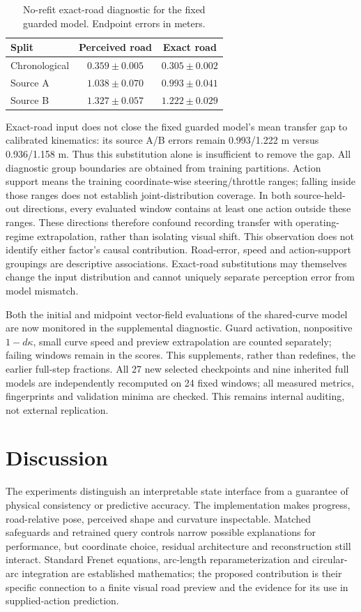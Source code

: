 \documentclass[preprint,12pt]{elsarticle}
\begin{document}
\begin{table}[htbp]
\centering\small
\caption{No-refit exact-road diagnostic for the fixed guarded model. Endpoint errors in meters.}
\label{tab:branch_oracle}
\begin{tabular}{lcc}\toprule
Split & Perceived road & Exact road \\\midrule
Chronological & $0.359 \pm 0.005$ & $0.305 \pm 0.002$ \\
Source A & $1.038 \pm 0.070$ & $0.993 \pm 0.041$ \\
Source B & $1.327 \pm 0.057$ & $1.222 \pm 0.029$ \\
\bottomrule\end{tabular}
\end{table}

Exact-road input does not close the fixed guarded model's mean transfer gap to
calibrated kinematics: its source A/B errors remain 0.993/1.222 m versus
0.936/1.158 m. Thus this substitution alone is insufficient to remove the gap.
All diagnostic group boundaries are obtained from training partitions.
Action support means the training coordinate-wise steering/throttle ranges;
falling inside those ranges does not establish joint-distribution coverage.
In both source-held-out directions, every evaluated window contains at least
one action outside these ranges. These directions therefore confound recording
transfer with operating-regime extrapolation, rather than isolating visual
shift. This observation does not identify either factor's causal contribution.
Road-error, speed and action-support groupings are descriptive associations.
Exact-road substitutions may themselves change the input distribution and
cannot uniquely separate perception error from model mismatch.

Both the initial and midpoint vector-field evaluations of the shared-curve
model are now monitored in the supplemental diagnostic. Guard activation,
nonpositive $1-d\kappa$, small curve speed and preview extrapolation are counted
separately; failing windows remain in the scores. This supplements, rather than
redefines, the earlier full-step fractions. All 27 new selected checkpoints and
nine inherited full models are independently recomputed on 24 fixed windows;
all measured metrics, fingerprints and validation minima are checked. This
remains internal auditing, not external replication.

\section{Discussion}\label{sec:discussion}
The experiments distinguish an interpretable state interface from a guarantee
of physical consistency or predictive accuracy. The implementation makes
progress, road-relative pose, perceived shape and curvature inspectable.
Matched safeguards and retrained query controls narrow possible explanations
for performance, but coordinate choice, residual architecture and reconstruction
still interact. Standard Frenet equations, arc-length reparameterization and
circular-arc integration are established mathematics; the proposed contribution
is their specific connection to a finite visual road preview and the evidence
for its use in supplied-action prediction.
\end{document}
